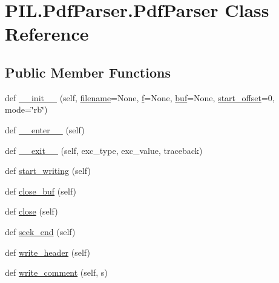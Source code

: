 \hypertarget{classPIL_1_1PdfParser_1_1PdfParser}{}\section{P\+I\+L.\+Pdf\+Parser.\+Pdf\+Parser Class Reference}
\label{classPIL_1_1PdfParser_1_1PdfParser}
\subsection*{Public Member Functions}
\begin{DoxyCompactItemize}
\item 
def \hyperlink{classPIL_1_1PdfParser_1_1PdfParser_a8985e5b37a5a97613616eadd9e2699ac}{\+\_\+\+\_\+init\+\_\+\+\_\+} (self, \hyperlink{classPIL_1_1PdfParser_1_1PdfParser_ab9551413e0825fd42feb1d4db625678c}{filename}=None, \hyperlink{classPIL_1_1PdfParser_1_1PdfParser_af9b8a3dc7186c5b6d8e55ec12b11a2f2}{f}=None, \hyperlink{classPIL_1_1PdfParser_1_1PdfParser_a9415ec570537b797c62a91e93f08a099}{buf}=None, \hyperlink{classPIL_1_1PdfParser_1_1PdfParser_a063b01fc065f9fcefe733d286add5ddb}{start\+\_\+offset}=0, mode=\char`\"{}rb\char`\"{})
\item 
def \hyperlink{classPIL_1_1PdfParser_1_1PdfParser_a4d1339a69669b24472c3e8815ee377a6}{\+\_\+\+\_\+enter\+\_\+\+\_\+} (self)
\item 
def \hyperlink{classPIL_1_1PdfParser_1_1PdfParser_a64faeee31a998dc7d15b91c3d610c495}{\+\_\+\+\_\+exit\+\_\+\+\_\+} (self, exc\+\_\+type, exc\+\_\+value, traceback)
\item 
def \hyperlink{classPIL_1_1PdfParser_1_1PdfParser_aaad53e64044cbb9102b7c433faf8f12d}{start\+\_\+writing} (self)
\item 
def \hyperlink{classPIL_1_1PdfParser_1_1PdfParser_a9f5c906e81f207e63aa0d82617dcd62d}{close\+\_\+buf} (self)
\item 
def \hyperlink{classPIL_1_1PdfParser_1_1PdfParser_a4d409f8507a484b5db58af7eb7b4b984}{close} (self)
\item 
def \hyperlink{classPIL_1_1PdfParser_1_1PdfParser_abc9fbd1afe165182d6ef643ecc12e7db}{seek\+\_\+end} (self)
\item 
def \hyperlink{classPIL_1_1PdfParser_1_1PdfParser_a07872fd2283863baaa879025c59b06a1}{write\+\_\+header} (self)
\item 
def \hyperlink{classPIL_1_1PdfParser_1_1PdfParser_a2a43ac6eba8b4ad23dd04d60e82d9131}{write\+\_\+comment} (self, s)
\item 

\end{DoxyCompactItemize}
